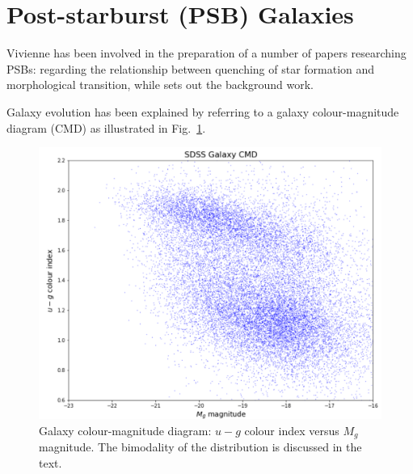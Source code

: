 \section{Post-starburst (PSB) Galaxies}
\label{sec:PSBs}
Vivienne has been involved in the preparation of a number of papers researching PSBs: \citet{2017MNRAS.472.1401A} regarding the relationship between quenching of star formation and morphological transition, while \citet{2016MNRAS.463..832W} sets out the background work.
\par Galaxy evolution has been explained by referring to a galaxy colour-magnitude diagram (CMD) as illustrated in Fig.~\ref{fig:CMD1}.

\begin{figure}
	\includegraphics[width=\columnwidth]{images/galaxyCMD.PNG}
    \caption{Galaxy colour-magnitude diagram: $u-g$ colour index versus $M_g$ magnitude. The bimodality of the distribution is discussed in the text.}
    \label{fig:CMD1}
\end{figure}